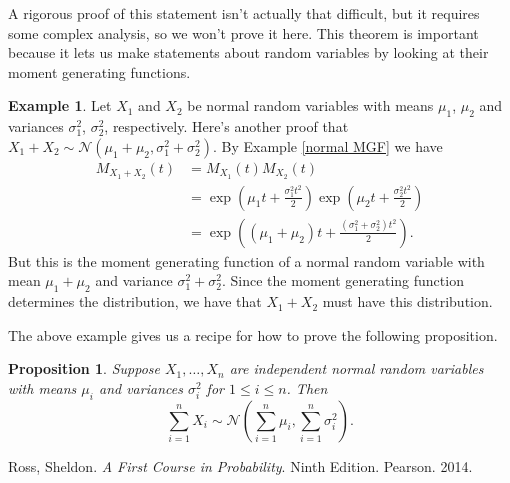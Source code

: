 \documentclass[12pt]{article}
\theoremstyle{plain}
\newtheorem{proposition}[theorem]{Proposition}
\theoremstyle{definition}
\newtheorem{example}[theorem]{Example}
\theoremstyle{remark}
\begin{document}
A rigorous proof of this statement isn't actually that difficult, but it requires some complex analysis, so we won't prove it here.
This theorem is important because it lets us make statements about random variables by looking at their moment generating functions.

\begin{example}
    Let $X_1$ and $X_2$ be normal random variables with means $\mu_1$, $\mu_2$ and variances $\sigma_1^2$, $\sigma_2^2$, respectively.
    Here's another proof that $X_1 + X_2 \sim \mathcal{N}(\mu_1+\mu_2, \sigma_1^2+\sigma_2^2)$.
    By Example \ref{normal MGF} we have
    \begin{align*}
        M_{X_1+X_2}(t) &= M_{X_1}(t)M_{X_2}(t)\\
        &= \exp\left(\mu_1t + \frac{\sigma_1^2t^2}{2}\right)\exp\left(\mu_2t + \frac{\sigma_2^2t^2}{2}\right)\\
        &=\exp\left((\mu_1+\mu_2)t + \frac{(\sigma_1^2+\sigma_2^2)t^2}{2}\right).
    \end{align*}
    But this is the moment generating function of a normal random variable with mean $\mu_1+\mu_2$ and variance $\sigma_1^2+\sigma_2^2$.
    Since the moment generating function determines the distribution, we have that $X_1+X_2$ must have this distribution.
\end{example}

The above example gives us a recipe for how to prove the following proposition.
\begin{proposition}
    Suppose $X_1, \ldots, X_n$ are independent normal random variables with means $\mu_i$ and variances $\sigma_i^2$ for $1\leq i\leq n$.
    Then
    \[
        \sum_{i=1}^nX_i \sim \mathcal{N}\left(\sum_{i=1}^n\mu_i, \sum_{i=1}^n\sigma_i^2\right).
    \]
\end{proposition}


\begin{thebibliography}{13}

 Ross, Sheldon. \textit{A First Course in Probability}. Ninth Edition. Pearson. 2014.



 
\end{thebibliography}
\end{document}
